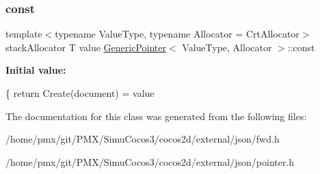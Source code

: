 \subsubsection{\texorpdfstring{const}{const}\hspace{0.1cm}{\footnotesize\ttfamily [3/3]}}
{\footnotesize\ttfamily template$<$typename Value\+Type, typename Allocator = Crt\+Allocator$>$ \\
stack\+Allocator T value \hyperlink{classGenericPointer}{Generic\+Pointer}$<$ Value\+Type, Allocator $>$\+::const}

{\bfseries Initial value\+:}
\begin{DoxyCode}
\{
            \textcolor{keywordflow}{return} Create(document) = value
\end{DoxyCode}


The documentation for this class was generated from the following files\+:\begin{DoxyCompactItemize}
\item 
/home/pmx/git/\+P\+M\+X/\+Simu\+Cocos3/cocos2d/external/json/fwd.\+h\item 
/home/pmx/git/\+P\+M\+X/\+Simu\+Cocos3/cocos2d/external/json/pointer.\+h\end{DoxyCompactItemize}
